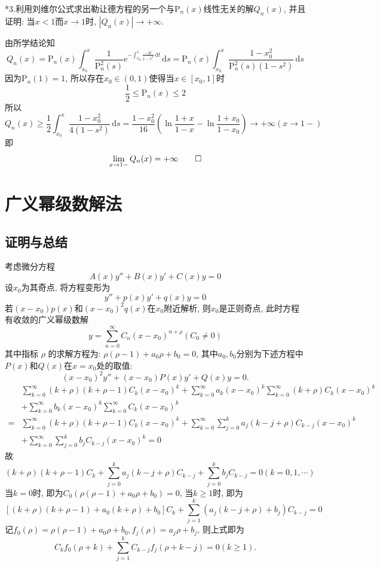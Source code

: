 \documentclass[titlepage,11pt,a4paper,twoside]{report}
\makeatletter
\newcommand\diff{\,\mathrm{d}}
\newcommand\e{\mathrm{e}}
\renewenvironment{proof}{\par
	\pushQED{\qed}%
	\normalfont \topsep1\p@\@plus6\p@\relax
	\trivlist
	\item\relax
	{\hspace*{\parindent}{\heiti 证明}\@addpunct{:}}\hspace\labelsep\ignorespaces
}{%
	\popQED\endtrivlist\@endpefalse
}
\makeatother
\begin{document}
*3.利用刘维尔公式求出勒让德方程的另一个与$\mathrm{P}_n(x)$线性无关的解$Q_n(x)$, 并且证明: 当$x<1$而$x\to1$时, $|Q_n(x)|\to+\infty$.
\begin{proof} 
由所学结论知
\[Q_n(x)=\mathrm{P}_n(x)\int_{x_0}^x\frac{1}{\mathrm{P}_n^2(s)}\e^{-\int_{x_0}^s\frac{-2t}{1-t^2}\diff t}\diff s=\mathrm{P}_n(x)\int_{x_0}^x\frac{1-x_0^2}{\mathrm{P}_n^2(s)(1-s^2)}\diff s\]
因为$\mathrm{P}_n(1)=1$, 所以存在$x_0\in(0,1)$使得当$x\in[x_0,1]$时
\[\frac{1}{2}\leq\mathrm{P}_n(x)\leq2\]
所以\[Q_n(x)\geq\frac{1}{2}\int_{x_0}^x\frac{1-x_0^2}{4(1-s^2)}\diff s=\frac{1-x_0^2}{16}\left(\ln\frac{1+x}{1-x}-\ln\frac{1+x_0}{1-x_0}\right)\to+\infty(x\to1-)\]
即\[\lim_{x\to1-}Q_n(x)=+\infty\qedhere\]
\end{proof}
\section{广义幂级数解法}
\subsection{证明与总结}
考虑微分方程\[A(x)y''+B(x)y'+C(x)y=0\]
设$x_0$为其奇点, 将方程变形为
\[y''+p(x)y'+q(x)y=0\]
若$(x-x_0)p(x)$和$(x-x_0)^2q(x)$在$x_0$附近解析, 则$x_0$是正则奇点, 此时方程有收敛的广义幂级数解
\[y=\sum_{n=0}^{\infty}C_n(x-x_0)^{n+\rho}(C_0\neq0)\]
其中指标 $\rho$ 的求解方程为: $\rho(\rho-1)+a_0\rho+b_0=0$, 其中$a_0,b_0$分别为下述方程中$P(x)$和$Q(x)$在$x=x_0$处的取值:
\[(x-x_0)^2y''+(x-x_0)P(x)y'+Q(x)y=0.\]
\newline
\[\begin{split}
&\sum_{k=0}^{\infty}(k+\rho)(k+\rho-1)C_k(x-x_0)^k+\sum_{k=0}^{\infty}a_k(x-x_0)^k\sum_{k=0}^{\infty}(k+\rho)C_k(x-x_0)^k\\
&+\sum_{k=0}^{\infty}b_k(x-x_0)^k\sum_{k=0}^{\infty}C_k(x-x_0)^k\\
=&\sum_{k=0}^{\infty}(k+\rho)(k+\rho-1)C_k(x-x_0)^k+\sum_{k=0}^{\infty}\sum_{j=0}^ka_j(k-j+\rho)C_{k-j}(x-x_0)^k\\
&+\sum_{k=0}^{\infty}\sum_{j=0}^kb_jC_{k-j}(x-x_0)^k=0
\end{split}\]
故\[(k+\rho)(k+\rho-1)C_k+\sum_{j=0}^ka_j(k-j+\rho)C_{k-j}+\sum_{j=0}^kb_jC_{k-j}=0(k=0,1,\cdots)\]
当$k=0$时, 即为$C_0(\rho(\rho-1)+a_0\rho+b_0)=0$, 当$k\geq1$时, 即为
\[\left[(k+\rho)(k+\rho-1)+a_0(k+\rho)+b_0\right]C_k+\sum_{j=1}^k\left(a_j(k-j+\rho)+b_j\right)C_{k-j}=0\]
记$f_0(\rho)=\rho(\rho-1)+a_0\rho+b_0, f_j(\rho)=a_j\rho+b_j$, 则上式即为
\[C_kf_0(\rho+k)+\sum_{j=1}^kC_{k-j}f_j(\rho+k-j)=0(k\geq1).\]
\end{document}
